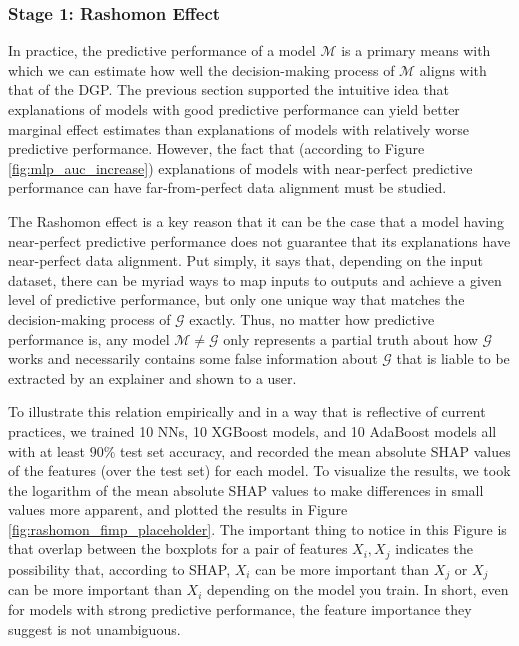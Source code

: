 \documentclass[mnsc,blindrev]{informs3}
\newcommand{\mG}{\mathcal{G}}
\newcommand{\mM}{\mathcal{M}}
\begin{document}
    
    
    
    
    \subsubsection{Stage 1: Rashomon Effect}
        \label{sec:rashomon_effect}
        In practice, the predictive performance of a model $\mathcal{M}$ is a primary means with which we can estimate how well the decision-making process of $\mathcal{M}$ aligns with that of the DGP. The previous section supported the intuitive idea that explanations of models with good predictive performance can yield better marginal effect estimates than explanations of models with relatively worse predictive performance. However, the fact that (according to Figure \ref{fig:mlp_auc_increase}) explanations of models with near-perfect predictive performance can have far-from-perfect data alignment must be studied.   
        
        The Rashomon effect is a key reason that it can be the case that a model having near-perfect predictive performance does not guarantee that its explanations have near-perfect data alignment. Put simply, it says that, depending on the input dataset, there can be myriad ways to map inputs to outputs and achieve a given level of predictive performance, but only one unique way that matches the decision-making process of $\mG$ exactly. Thus, no matter how predictive performance is, any model $\mM \neq \mG$ only represents a partial truth about how $\mG$ works and necessarily contains some false information about $\mG$ that is liable to be extracted by an explainer and shown to a user. 

        To illustrate this relation empirically and in a way that is reflective of current practices, we trained 10 NNs, 10 XGBoost models, and 10 AdaBoost models all with at least $90\%$ test set accuracy, and recorded the mean absolute SHAP values of the features (over the test set) for each model. To visualize the results, we took the logarithm of the mean absolute SHAP values to make differences in small values more apparent, and plotted the results in Figure \ref{fig:rashomon_fimp_placeholder}. The important thing to notice in this Figure is that overlap between the boxplots for a pair of features $X_i,X_j$ indicates the possibility that, according to SHAP, $X_i$ can be more important than $X_j$ or $X_j$ can be more important than $X_i$ depending on the model you train. In short, even for models with strong predictive performance, the feature importance they suggest is not unambiguous. 
\end{document}
